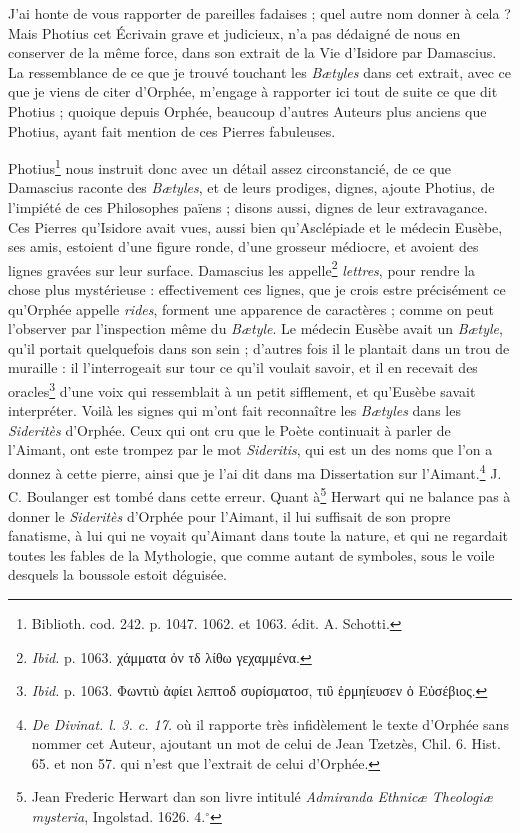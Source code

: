 \documentclass[a4paper, 11pt, oneside, polutonikogreek, french]{article}
\begin{document}
J'ai honte de vous rapporter de pareilles fadaises ; quel autre nom donner à cela ? Mais Photius cet Écrivain grave et judicieux, n'a pas dédaigné de nous en conserver de la même force, dans son extrait de la Vie d'Isidore par Damascius. La ressemblance de ce que je trouvé touchant les \emph{Bætyles} dans cet extrait, avec ce que je viens de citer d'Orphée, m'engage à rapporter ici tout de suite ce que dit Photius ; quoique depuis Orphée, beaucoup d'autres Auteurs plus anciens que Photius, ayant fait mention de ces Pierres fabuleuses.

Photius\footnote{Biblioth. cod. 242. p. 1047. 1062. et 1063. édit. A. Schotti.} nous instruit donc avec un détail assez circonstancié, de ce que Damascius raconte des \emph{Bætyles}, et de leurs prodiges, dignes, ajoute Photius, de l'impiété de ces Philosophes païens ; disons aussi, dignes de leur extravagance. Ces Pierres qu'Isidore avait vues, aussi bien qu'Asclépiade et le médecin Eusèbe, ses amis, estoient d'une figure ronde, d'une grosseur médiocre, et avoient des lignes gravées sur leur surface. Damascius les appelle\footnote{\emph{Ibid.} p. 1063. χάμματα ὀν τδ λίθω γεχαμμένα.} \emph{lettres}, pour rendre la chose plus mystérieuse : effectivement ces lignes, que je crois estre précisément ce qu'Orphée appelle \emph{rides}, forment une apparence de caractères ; comme on peut l'observer par l'inspection même du \emph{Bætyle}. Le médecin Eusèbe avait un \emph{Bætyle}, qu'il portait quelquefois dans son sein ; d'autres fois il le plantait dans un trou de muraille : il l'interrogeait sur tour ce qu'il voulait savoir, et il en recevait des oracles\footnote{\emph{Ibid.} p. 1063. Φωντιὺ ἀφίει λεπτοδ συρίσματοσ, τιὒ ἑρμηίευσεν ὁ Εὐσέβιος.} d'une voix qui ressemblait à un petit sifflement, et qu'Eusèbe savait interpréter. Voilà les signes qui m'ont fait reconnaître les \emph{Bætyles} dans les \emph{Sideritès} d'Orphée. Ceux qui ont cru que le Poète continuait à parler de l'Aimant, ont este trompez par le mot \emph{Sideritis}, qui est un des noms que l'on a donnez à cette pierre, ainsi que je l'ai dit dans ma Dissertation sur l'Aimant.\footnote{\emph{De Divinat. l. 3. c. 17.} où il rapporte très infidèlement le texte d'Orphée sans nommer cet Auteur, ajoutant un mot de celui de Jean Tzetzès, Chil. 6. Hist. 65. et non 57. qui n'est que l'extrait de celui d'Orphée.} J. C. Boulanger est tombé dans cette erreur. Quant à\footnote{Jean Frederic Herwart dan son livre intitulé \emph{Admiranda Ethnicæ Theologiæ mysteria}, Ingolstad. 1626. 4.$^\circ$} Herwart qui ne balance pas à donner le \emph{Sideritès} d'Orphée pour l'Aimant, il lui suffisait de son propre fanatisme, à lui qui ne voyait qu'Aimant dans toute la nature, et qui ne regardait toutes les fables de la Mythologie, que comme autant de symboles, sous le voile desquels la boussole estoit déguisée.
\end{document}
